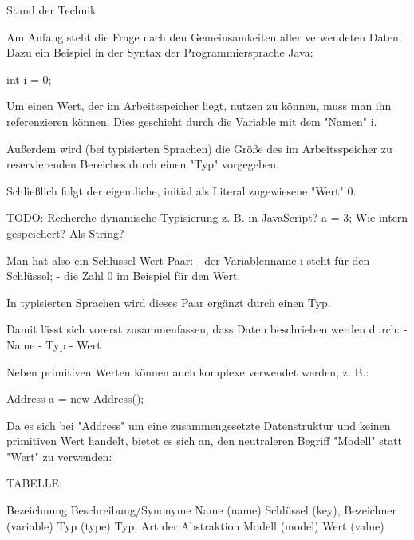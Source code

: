 
Stand der Technik

Am Anfang steht die Frage nach den Gemeinsamkeiten aller verwendeten Daten.
Dazu ein Beispiel in der Syntax der Programmiersprache Java:

int i = 0;

Um einen Wert, der im Arbeitsspeicher liegt, nutzen zu können,
muss man ihn referenzieren können.
Dies geschieht durch die Variable mit dem "Namen" i.

Außerdem wird (bei typisierten Sprachen) die Größe
des im Arbeitsspeicher zu reservierenden Bereiches
durch einen "Typ" vorgegeben.

Schließlich folgt der eigentliche, initial als Literal
zugewiesene "Wert" 0.

TODO: Recherche dynamische Typisierung z. B. in JavaScript?
a = 3;
Wie intern gespeichert? Als String?

Man hat also ein Schlüssel-Wert-Paar:
- der Variablenname i steht für den Schlüssel;
- die Zahl 0 im Beispiel für den Wert.

In typisierten Sprachen wird dieses Paar ergänzt durch einen Typ.

Damit lässt sich vorerst zusammenfassen, dass Daten beschrieben
werden durch:
- Name
- Typ
- Wert

Neben primitiven Werten können auch komplexe verwendet werden, z. B.:

Address a = new Address();

Da es sich bei "Address" um eine zusammengesetzte Datenstruktur
und keinen primitiven Wert handelt, bietet es sich an, den
neutraleren Begriff "Modell" statt "Wert" zu verwenden:

TABELLE:

Bezeichnung     Beschreibung/Synonyme
Name (name)     Schlüssel (key), Bezeichner (variable)
Typ (type)      Typ, Art der Abstraktion
Modell (model)  Wert (value)
